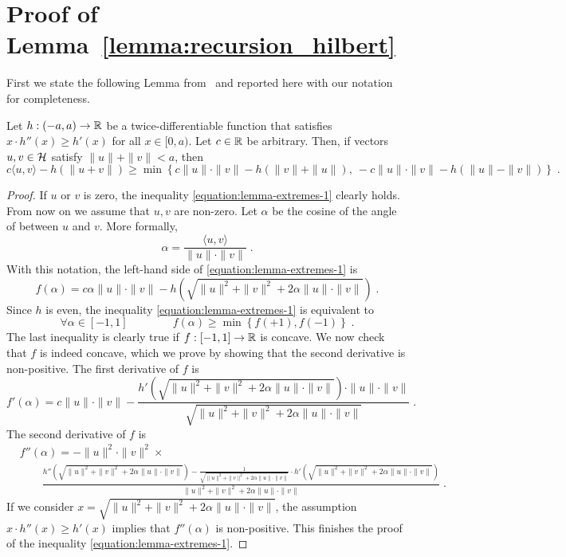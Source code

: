 \section{Proof of Lemma~\ref{lemma:recursion_hilbert}}
\label{section:hilbert-space-reduction}

First we state the following Lemma from~\cite{McMahanO14} and reported here with our notation for completeness.
\begin{lemma}[Extremes]
\label{lemma:extremes}
Let $h:(-a,a) \to \mathbb{R}$ be a twice-differentiable function that
satisfies $x \cdot h''(x) \ge h'(x)$ for all $x \in [0,a)$. Let $c \in \mathbb{R}$
be arbitrary. Then, if vectors $u,v \in \mathcal{H}$ satisfy $\|u\| + \|v\| < a$, then
\begin{equation}
\label{equation:lemma-extremes-1}
c \langle u, v \rangle - h(\|u + v\|) \ge \min \left\{ c \|u\| \cdot \|v\| - h(\|v\| + \|u\|), \ - c \|u\| \cdot \|v\| - h(\|u\| - \|v\|) \right\} \; .
\end{equation}
\end{lemma}
%
\begin{proof}
If $u$ or $v$ is zero, the inequality \eqref{equation:lemma-extremes-1} clearly
holds. From now on we assume that $u,v$ are non-zero. Let $\alpha$ be the cosine
of the angle of between $u$ and $v$. More formally,
$$
\alpha = \frac{\langle u, v \rangle}{\|u\| \cdot \|v\|} \; .
$$
With this notation, the left-hand side of \eqref{equation:lemma-extremes-1} is
$$
f(\alpha) = c \alpha \|u\| \cdot \|v\| - h(\sqrt{\|u\|^2 + \|v\|^2 + 2 \alpha \|u\| \cdot \|v\|}) \; .
$$
Since $h$ is even, the inequality \eqref{equation:lemma-extremes-1} is equivalent to
$$
\forall \alpha \in [-1,1] \qquad \qquad f(\alpha) \ge \min \left\{f(+1), f(-1)\right\} \; .
$$
The last inequality is clearly true if $f:[-1,1] \to \mathbb{R}$ is concave. We now
check that $f$ is indeed concave, which we prove by showing that the second
derivative is non-positive. The first derivative of $f$ is
$$
f'(\alpha) = c \|u\| \cdot \|v\| - \frac{h'(\sqrt{\|u\|^2 + \|v\|^2 + 2 \alpha \|u\| \cdot \|v\|}) \cdot \|u\| \cdot \|v\|}{\sqrt{\|u\|^2 + \|v\|^2 + 2 \alpha \|u\| \cdot \|v\|}} \; .
$$
The second derivative of $f$ is
\begin{align*}
&f''(\alpha) = - \|u\|^2 \cdot \|v\|^2 \times \\
&\qquad \frac{h''(\sqrt{\|u\|^2 + \|v\|^2 + 2 \alpha \|u\| \cdot \|v\|})  - \frac{1}{\sqrt{\|u\|^2 + \|v\|^2 + 2\alpha \|u\| \cdot \|v\|}} \cdot h'(\sqrt{\|u\|^2 + \|v\|^2 + 2 \alpha \|u\| \cdot \|v\|})  }{\|u\|^2 + \|v\|^2 + 2 \alpha \|u\| \cdot \|v\|} \; .
\end{align*}
If we consider $x = \sqrt{\|u\|^2 + \|v\|^2 + 2 \alpha \|u\| \cdot \|v\|}$, the
assumption $x \cdot h''(x) \ge h'(x)$ implies that $f''(\alpha)$ is non-positive.
This finishes the proof of the inequality \eqref{equation:lemma-extremes-1}.
\end{proof}

